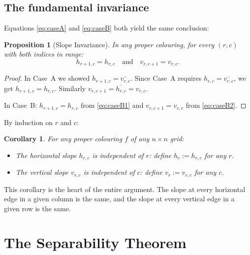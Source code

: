 \documentclass{article}
\newtheorem{corollary}[theorem]{Corollary}
\newtheorem{proposition}[theorem]{Proposition}
\newcommand{\comp}[1]{\bar{#1}}   %
\begin{document}
\subsection{The fundamental invariance}

Equations \eqref{eq:caseA} and \eqref{eq:caseB} both yield
the same conclusion:

\begin{proposition}[Slope Invariance]
\label{prop:inv}
In any proper colouring, for every $(r,c)$ with both indices
in range:
\[
  h_{r+1,c} = h_{r,c}
  \quad\text{and}\quad
  v_{r,c+1} = v_{r,c}.
\]
\end{proposition}

\begin{proof}
In Case~A we showed $h_{r+1,c} = \comp{v_{r,c}}$.  Since
Case~A requires $h_{r,c} = \comp{v_{r,c}}$, we get
$h_{r+1,c} = h_{r,c}$.  Similarly $v_{r,c+1} = \comp{h_{r,c}}
= v_{r,c}$.

In Case~B: $h_{r+1,c} = h_{r,c}$ from \eqref{eq:caseB1} and
$v_{r,c+1} = v_{r,c}$ from \eqref{eq:caseB2}.
\end{proof}

By induction on $r$ and $c$:

\begin{corollary}
\label{cor:factored}
For any proper colouring $f$ of any $n\times n$ grid:
\begin{itemize}
  \item The horizontal slope $h_{r,c}$ is independent of $r$:
    define $h_c := h_{r,c}$ for any $r$.
  \item The vertical slope $v_{r,c}$ is independent of $c$:
    define $v_r := v_{r,c}$ for any $c$.
\end{itemize}
\end{corollary}

This corollary is the heart of the entire argument.
The slope at every horizontal edge in a given column is the
same, and the slope at every vertical edge in a given row is
the same.

\section{The Separability Theorem}
\label{sec:separability}
\end{document}
